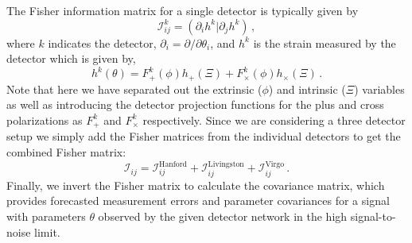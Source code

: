 \documentclass[twocolumn]{aastex631}
\newcommand{\mi}[1]{\textbf{\color{teal}(MI: #1)}}
\newcommand{\amc}[1]{{\color{red}[AC: #1]}}
\begin{document}
The Fisher information matrix for a single detector is typically given by 
\begin{equation}
    \label{eq:fisher}
    \mathcal{I}^{k}_{ij} = (\partial_i h^k | \partial_j h^k) \, ,
\end{equation}
where $k$ indicates the detector, $\partial_i = \partial/\partial \theta_i$, and $h^k$ is the strain measured by the detector which is given by,
\begin{equation}
    h^k(\theta) = F^k_+(\phi) h_{+}(\Xi) + F^k_\times(\phi) h_{\times}(\Xi) \, .
\end{equation}
Note that here we have separated out the extrinsic ($\phi$) and intrinsic ($\Xi$) variables as well as introducing the detector projection functions for the plus and cross polarizations as $F^k_+$ and $F^k_\times$ respectively.
Since we are considering a three detector setup we simply add the Fisher matrices from the individual detectors to get the combined Fisher matrix:
\begin{equation}
    \mathcal{I}_{ij} =  \mathcal{I}^{\mathrm{Hanford}}_{ij} + \mathcal{I}^{\mathrm{Livingston}}_{ij} + \mathcal{I}^{\mathrm{Virgo}}_{ij}   \, .
\end{equation}
Finally, we invert the Fisher matrix to calculate the covariance matrix,
which provides forecasted measurement errors and parameter covariances for a signal with parameters $\theta$ observed by the given detector network in the high signal-to-noise limit.

\end{document}
